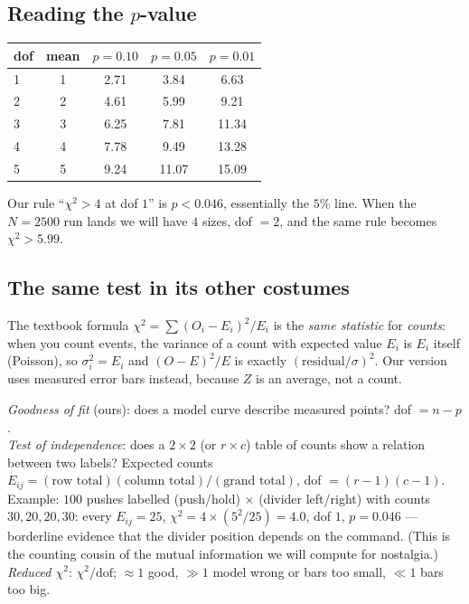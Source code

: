 \documentclass[11pt,a4paper]{article}
\begin{document}
\subsection{Reading the \texorpdfstring{$p$}{p}-value}
\begin{num}
\begin{tabular}{@{}lcccc@{}}
\toprule
dof & mean & $p = 0.10$ & $p = 0.05$ & $p = 0.01$\\
\midrule
1 & 1 & 2.71 & 3.84 & 6.63\\
2 & 2 & 4.61 & 5.99 & 9.21\\
3 & 3 & 6.25 & 7.81 & 11.34\\
4 & 4 & 7.78 & 9.49 & 13.28\\
5 & 5 & 9.24 & 11.07 & 15.09\\
\bottomrule
\end{tabular}

Our rule ``$\chi^2>4$ at dof $1$'' is $p<0.046$, essentially the $5\%$ line. When the $N = 2500$ run lands we will have $4$ sizes, dof $= 2$, and the same rule becomes $\chi^2 > 5.99$.
\end{num}

\subsection{The same test in its other costumes}
\begin{eli}
The textbook formula $\chi^2 = \sum (O_i - E_i)^2/E_i$ is the \emph{same statistic} for \emph{counts}: when you count events, the variance of a count with expected value $E_i$ is $E_i$ itself (Poisson), so $\sigma_i^2 = E_i$ and $(O-E)^2/E$ is exactly $(\text{residual}/\sigma)^2$. Our version uses measured error bars instead, because $Z$ is an average, not a count.

\emph{Goodness of fit} (ours): does a model curve describe measured points? dof $= n - p$.\\
\emph{Test of independence}: does a $2\times2$ (or $r\times c$) table of counts show a relation between two labels? Expected counts $E_{ij} = (\text{row total})(\text{column total})/(\text{grand total})$, dof $= (r-1)(c-1)$. Example: $100$ pushes labelled (push/hold) $\times$ (divider left/right) with counts $30,20,20,30$: every $E_{ij} = 25$, $\chi^2 = 4\times(5^2/25) = 4.0$, dof $1$, $p = 0.046$ --- borderline evidence that the divider position depends on the command. (This is the counting cousin of the mutual information we will compute for nostalgia.)\\
\emph{Reduced $\chi^2$}: $\chi^2/\text{dof}$; $\approx1$ good, $\gg1$ model wrong or bars too small, $\ll1$ bars too big.
\end{eli}
\end{document}
